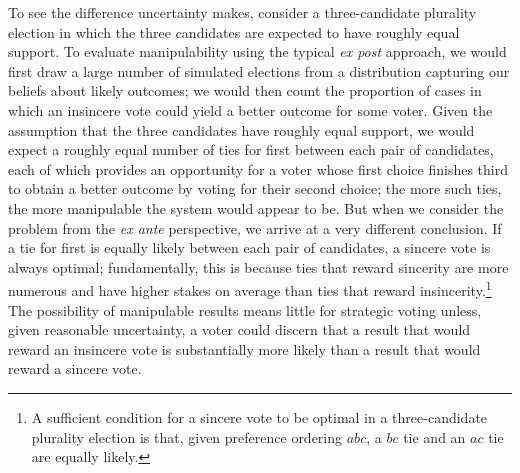\documentclass[11pt,a4paper]{article}
\begin{document}
To see the difference uncertainty makes, %
consider a three-candidate plurality election in which the three candidates are expected to have roughly equal support. To evaluate manipulability using the typical \emph{ex post} approach, we would first draw a large number of simulated elections from a distribution capturing our beliefs about likely outcomes; we would then count the proportion of cases in which an insincere vote could yield a better outcome for some voter. Given the assumption that the three candidates have roughly equal support, we would expect a roughly equal number of ties for first between each pair of candidates, each of which provides an opportunity for a voter whose first choice finishes third to obtain a better outcome by voting for their second choice; the more such ties, the more manipulable the system would appear to be. But when we consider the problem from the \emph{ex ante} perspective, we arrive at a very different conclusion. If a tie for first is equally likely between each pair of candidates, a sincere vote is always optimal; fundamentally, this is because ties that reward sincerity are more numerous and have higher stakes on average than ties that reward insincerity.\footnote{A sufficient condition for a sincere vote to be optimal in a three-candidate plurality election is that, given preference ordering $abc$, a $bc$ tie and an $ac$ tie are equally likely.} The possibility of manipulable results means little for strategic voting unless, given reasonable uncertainty, a voter could discern that a result that would reward an insincere vote is substantially more likely than a result that would reward a sincere vote. 
\end{document}
